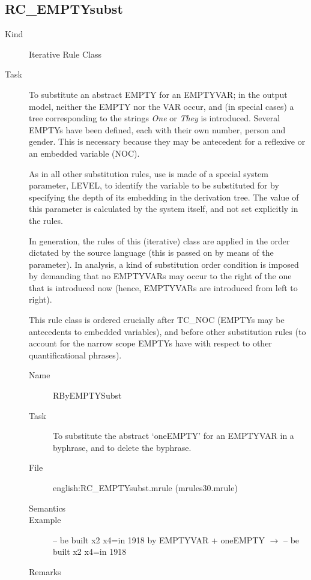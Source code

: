 \newpage
\subsection{RC\_EMPTYsubst}

\begin{description}
\item[Kind] Iterative Rule Class
\item[Task] To substitute an abstract EMPTY for an EMPTYVAR; in the output
model, neither the EMPTY nor the VAR occur, and (in 
special cases) a tree corresponding to the strings {\em One\/} or {\em They\/}
is introduced. Several EMPTYs 
have been defined, each with their own number, person and gender. This is
necessary because they may be antecedent for a reflexive or an embedded 
variable (NOC). 

As in all other substitution rules, use is made of a special system parameter, 
LEVEL, to identify the variable to be substituted for by specifying the depth 
of its embedding in the derivation tree. The value of this parameter is 
calculated by the system itself, and not set explicitly in the rules.

In generation, the rules of this (iterative) class are applied in the order 
dictated by the source language (this is passed on by 
means of the parameter). In analysis, a kind of 
substitution order condition is imposed by demanding that no EMPTYVARs may 
occur to the right of the one that is introduced now (hence, EMPTYVARs are 
introduced from left to right). 

This rule class is ordered crucially after TC\_NOC (EMPTYs may be antecedents 
to embedded variables), and before other substitution rules (to account for 
the narrow scope EMPTYs have with respect to other quantificational phrases).

\vspace{1 cm}
\begin{description}
\item[Name] RByEMPTYSubst
\item[Task] To substitute the abstract `oneEMPTY' for an EMPTYVAR in a 
byphrase, and to delete the byphrase.
\item[File] english:RC\_EMPTYsubst.mrule (mrules30.mrule)
\item[Semantics]
\item[Example] -- be built x2 x4=in 1918 by EMPTYVAR + oneEMPTY $\rightarrow$ 
-- be built x2 x4=in 1918
\item[Remarks] 
\end{description}


\end{description}
